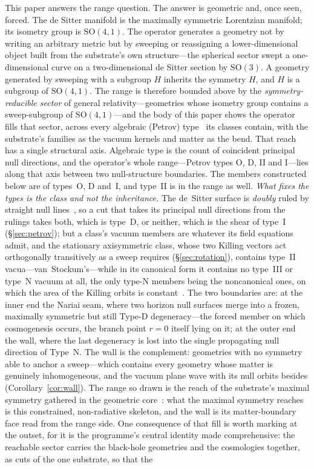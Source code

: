 \documentclass[11pt,a4paper]{article}
\theoremstyle{definition}
\newcommand{\so}{\mathrm{SO}(4,1)}
\begin{document}
This paper answers the range question. The answer is geometric and, once seen, forced. The de Sitter manifold is the maximally symmetric Lorentzian manifold; its isometry group is $\so$. The operator generates a geometry not by writing an arbitrary metric but by sweeping or reassigning a lower-dimensional object built from the substrate's own structure---the spherical sector swept a one-dimensional curve on a two-dimensional de Sitter section by $\mathrm{SO}(3)$. A geometry generated by sweeping with a subgroup $H$ inherits the symmetry $H$, and $H$ is a subgroup of $\so$. The range is therefore bounded above by the \emph{symmetry-reducible sector} of general relativity---geometries whose isometry group contains a sweep-subgroup of $\so$---and the body of this paper shows the operator fills that sector, across every algebraic (Petrov) type~\cite{Petrov1954} its classes contain, with the substrate's families as the vacuum kernels and matter as the bend. That reach has a single structural axis. Algebraic type is the count of coincident principal null directions, and the operator's whole range---Petrov types O, D, II and I---lies along that axis between two null-structure boundaries. The members constructed below are of types~O, D and~I, and type~II is in the range as well. \emph{What fixes the types is the class and not the inheritance.} The de~Sitter surface is \emph{doubly} ruled by straight null lines~\cite{JanzenGeometricCore}, so a cut that takes its principal null directions from the rulings takes both, which is type~D, or neither, which is the shear of type~I (\S\ref{sec:petrov}); but a class's vacuum members are whatever its field equations admit, and the stationary axisymmetric class, whose two Killing vectors act orthogonally transitively as a sweep requires (\S\ref{sec:rotation}), contains type~II vacua---van~Stockum's---while in its canonical form it contains no type~III or type~N vacuum at all, the only type-N members being the noncanonical ones, on which the area of the Killing orbits is constant~\cite{Hoffman1969a,Hoffman1969b,MorisettiReinaTreves1980}. The two boundaries are: at the inner end the Nariai seam, where two horizon null surfaces merge into a frozen, maximally symmetric but still Type-D degeneracy---the forced member on which cosmogenesis occurs, the branch point $r=0$ itself lying on it; at the outer end the wall, where the last degeneracy is lost into the single propagating null direction of Type~N. The wall is the complement: geometries with no symmetry able to anchor a sweep---which contains every geometry whose matter is genuinely inhomogeneous, and the vacuum plane wave with its null orbits besides (Corollary~\ref{cor:wall}). The range so drawn is the reach of the substrate's maximal symmetry gathered in the geometric core~\cite{JanzenGeometricCore}: what the maximal symmetry reaches is this constrained, non-radiative skeleton, and the wall is its matter-boundary face read from the range side. One consequence of that fill is worth marking at the outset, for it is the programme's central identity made comprehensive: the reachable sector carries the black-hole geometries and the cosmologies together, as cuts of the one substrate, so that the 
\end{document}
